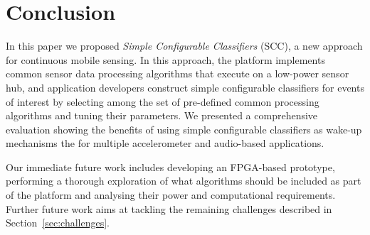 \section{Conclusion}
\label{sec:conclusion}

In this paper we proposed {\em Simple Configurable Classifiers} (SCC),
a new approach for continuous mobile sensing.  In this approach, the
platform implements common sensor data processing algorithms that
execute on a low-power sensor hub, and application developers
construct simple configurable classifiers for events of interest by
selecting among the set of pre-defined common processing
algorithms and tuning their parameters.  We presented a comprehensive 
evaluation showing the benefits of using simple configurable
classifiers as wake-up mechanisms the for multiple accelerometer and 
audio-based applications.

Our immediate future work includes developing an FPGA-based prototype,
performing a thorough exploration of what algorithms should 
be included as part of the platform and analysing their power and 
computational requirements.  Further future work aims at tackling 
the remaining challenges described in Section~\ref{sec:challenges}.  

